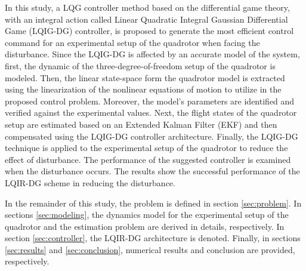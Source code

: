 \documentclass[3p,times]{elsarticle}
\begin{document}
In this study, a LQG controller method based on the differential game theory, with an integral action called Linear Quadratic Integral Gaussian Differential Game (LQIG-DG) controller, is proposed to generate the most efficient control command for an experimental setup of the quadrotor when facing the disturbance. Since the LQIG-DG is affected by an accurate model of the system, first, the dynamic of the three-degree-of-freedom setup of the quadrotor is modeled. Then, the linear state-space form the quadrotor model is extracted using the linearization of the nonlinear equations of motion to utilize in the proposed control problem. Moreover, the model's parameters are identified and verified against the experimental values. Next, the flight states of the quadrotor setup are estimated based on an Extended Kalman Filter (EKF) \cite{7794149, 9597497} and then compensated using the LQIG-DG controller architecture. Finally, the LQIG-DG technique is applied to the experimental setup of the quadrotor to reduce the effect of disturbance. The performance of the suggested controller is examined when the disturbance occurs. The results show the successful performance of the LQIR-DG scheme in reducing the disturbance.



In the remainder of this study, the problem is defined in section \ref{sec:problem}. In sections \ref{sec:modeling}, the dynamics model for the experimental setup of the quadrotor and the estimation problem are derived in details, 
respectively. In section \ref{sec:controller}, the LQIR-DG architecture is denoted. Finally, in sections \ref{sec:results} and \ref{sec:conclusion}, numerical results and conclusion are provided, respectively.
\end{document}
